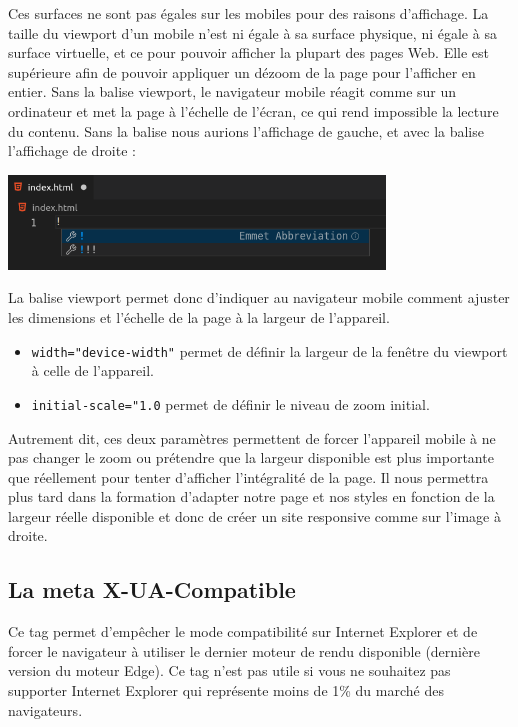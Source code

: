 \documentclass[a4paper]{article}
\begin{document}
Ces surfaces ne sont pas égales sur les mobiles pour des raisons d'affichage. La taille du viewport d'un mobile n'est ni égale à sa surface physique, ni égale à sa surface virtuelle, et ce pour pouvoir afficher la plupart des pages Web. Elle est supérieure afin de pouvoir appliquer un dézoom de la page pour l'afficher en entier. Sans la balise viewport, le navigateur mobile réagit comme sur un ordinateur et met la page à l'échelle de l'écran, ce qui rend impossible la lecture du contenu. Sans la balise nous aurions l'affichage de gauche, et avec la balise l'affichage de droite :
\begin{center}
\includegraphics[width=10cm]{images/image05.png}
\end{center}

La balise {\color{monOrange}viewport} permet donc d'indiquer au navigateur mobile comment ajuster les dimensions et l'échelle de la page à la largeur de l'appareil.
\begin{itemize}
\item {\tt width="device-width"} permet de définir la largeur de la fenêtre du viewport à celle de l'appareil.

\item {\tt initial-scale="1.0} permet de définir le niveau de zoom initial.
\end{itemize}


Autrement dit, ces deux paramètres permettent de forcer l'appareil mobile à ne pas changer le zoom ou prétendre que la largeur disponible est plus importante que réellement pour tenter d'afficher l'intégralité de la page. Il nous permettra plus tard dans la formation d'adapter notre page et nos styles en fonction de la largeur réelle disponible et donc de créer un site {\color{monOrange}responsive} comme sur l'image à droite.

\subsection{La {\color{monOrange}meta X-UA-Compatible}}
Ce tag permet d'empêcher le mode compatibilité sur {\color{monOrange}Internet Explorer} et de forcer le navigateur à utiliser le dernier moteur de rendu disponible (dernière version du moteur {\color{monOrange}Edge}). Ce {\color{monOrange}tag} n'est pas utile si vous ne souhaitez pas supporter Internet Explorer qui représente moins de 1\% du marché des navigateurs.
\end{document}
